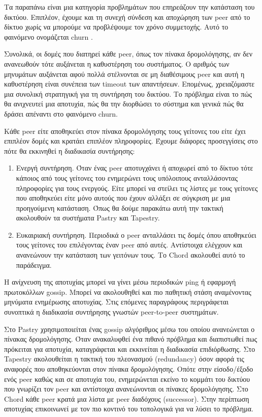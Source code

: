Τα παραπάνω είναι μια κατηγορία προβλημάτων που επηρεάζουν την κατάσταση 
του δικτύου. Επιπλέον, έχουμε και τη συνεχή σύνδεση και αποχώρηση των 
peer από το δίκτυο χωρίς να μπορούμε να προβλέψουμε τον χρόνο 
συμμετοχής. Αυτό το φαινόμενο ονομάζεται churn \citep{Buford2009}. 

Συνολικά, οι δομές που διατηρεί κάθε peer, όπως τον πίνακα δρομολόγησης, 
αν δεν ανανεωθούν τότε αυξάνεται η καθυστέρηση του συστήματος. Ο αριθμός 
των μηνυμάτων αυξάνεται αφού πολλά στέλνονται σε μη διαθέσιμους peer και 
αυτή η καθυστέρηση είναι συνέπεια των timeout των απαντήσεων. Επομένως, 
χρειαζόμαστε μια συνολική στρατηγική για τη συντήρηση του δικτύου. 
Το πρόβλημα είναι το πώς θα ανιχνευτεί μια αποτυχία, πώς θα την 
διορθώσει το σύστημα και γενικά πώς θα δράσει απέναντι στο φαινόμενο 
churn.

Κάθε peer είτε αποθηκεύει στον πίνακα δρομολόγησης τους γείτονες του 
είτε έχει επιπλέον δομές και κρατάει επιπλέον πληροφορίες. Έχουμε 
διάφορες προσεγγίσεις στο πότε θα εκκινηθεί η διαδικασία συντήρησης:

\begin{enumerate}
\item Ενεργή συντήρηση. Όταν ένας peer αποτυγχάνει ή αποχωρεί από το 
δίκτυο τότε κάποιος από τους γείτονες του ενημερώνει τους υπόλοιπους 
ανταλλάσοντας πληροφορίες για τους ενεργούς. Είτε μπορεί να στείλει τις 
λίστες με τους γείτονες που αποθηκεύει είτε μόνο αυτούς που έχουν αλλάξει 
σε σύγκριση με μια προηγούμενη κατάσταση. Όπως θα δούμε παρακάτω αυτή την 
τακτική ακολουθούν τα συστήματα Pastry και Tapestry.
\item Ευκαιριακή συντήρηση. Περιοδικά ο peer ανταλλάσει τις δομές όπου 
αποθηκεύει τους γείτονες του επιλέγοντας έναν peer από αυτές. Αντίστοιχα 
ελέγχουν και ανανεώνουν την κατάσταση των γειτόνων τους. Το Chord 
ακολουθεί αυτό το παράδειγμα.
\end{enumerate}

Η ανίχνευση της αποτυχίας μπορεί να γίνει μέσω περιοδικών ping ή 
εφαρμογή πρωτοκόλλων gossip. Μπορεί να ακολουθηθεί και πιο παθητική 
στάση αναμένοντας μηνύματα ενημέρωσης αποτυχίας. Στις επόμενες 
παραγράφους περιγράφεται συνοπτικά η διαδικασία συντήρησης γνωστών 
peer-to-peer συστημάτων.

Στο Pastry \citep{Pastry} χρησιμοποιείται ένας gossip αλγόριθμος μέσω 
του οποίου ανανεώνεται ο πίνακας δρομολόγησης. Όταν ανακαλυφθεί ένα 
πιθανό πρόβλημα και διαπιστωθεί πως πρόκειται για αποτυχία, καταγράφεται 
και εκκινείται η διαδικασία επιδιόρθωσης. Στο Tapestry \citep{Tapestry} 
ακολουθείται η τακτική του πλεονασμού (redundancy) όσον αφορά τις αναφορές 
που αποθηκεύονται στον πίνακα δρομολόγησης. Οπότε στην είσοδο/έξοδο ενός peer 
καθώς και σε αποτυχία του, ενημερώνεται εκείνο το κομμάτι του δικτύου που 
γνωρίζει τον peer και αντίστοιχα ανανεώνονται οι πίνακες δρομολόγησης. 
Στο Chord \citep{Chord} κάθε peer κρατά μια λίστα με peer διαδόχους 
(successor). Στην περίπτωση αποτυχίας επικοινωνεί με τον πιο κοντινό του 
τοπολογικά για να λύσει το πρόβλημα. 

